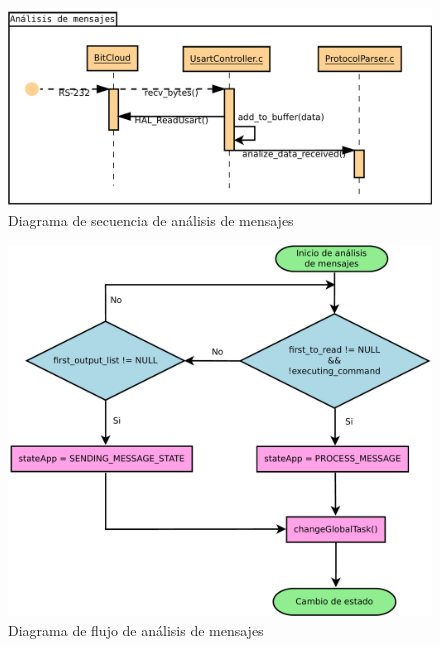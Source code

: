 \begin{figure}
	\centering
	\includegraphics[scale=0.45]{capitulo_3_imgs/analisis_mensajes_secuencia.pdf}
	\caption{Diagrama de secuencia de análisis de mensajes}
	\label{fig:diagrama_secuencia_analisis}
\end{figure}

\begin{figure}
	\centering
	\includegraphics[scale=0.35]{capitulo_3_imgs/analisis_mensajes_flujo.pdf}
	\caption{Diagrama de flujo de análisis de mensajes}
	\label{fig:diagrama_flujo_analisis}
\end{figure}

